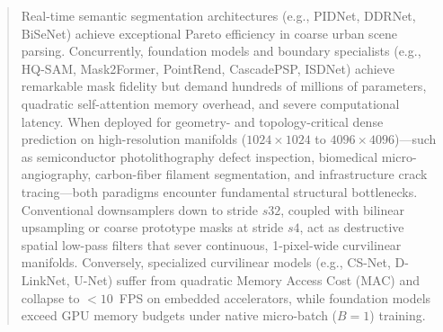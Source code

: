 \documentclass[11pt,a4paper]{article}
\begin{document}
\begin{abstract}
Real-time semantic segmentation architectures (e.g., PIDNet, DDRNet, BiSeNet) achieve exceptional Pareto efficiency in coarse urban scene parsing. Concurrently, foundation models and boundary specialists (e.g., HQ-SAM, Mask2Former, PointRend, CascadePSP, ISDNet) achieve remarkable mask fidelity but demand hundreds of millions of parameters, quadratic self-attention memory overhead, and severe computational latency. When deployed for geometry- and topology-critical dense prediction on high-resolution manifolds ($1024\times 1024$ to $4096\times 4096$)---such as semiconductor photolithography defect inspection, biomedical micro-angiography, carbon-fiber filament segmentation, and infrastructure crack tracing---both paradigms encounter fundamental structural bottlenecks. Conventional downsamplers down to stride $s32$, coupled with bilinear upsampling or coarse prototype masks at stride $s4$, act as destructive spatial low-pass filters that sever continuous, 1-pixel-wide curvilinear manifolds. Conversely, specialized curvilinear models (e.g., CS-Net, D-LinkNet, U-Net) suffer from quadratic Memory Access Cost (MAC) and collapse to $<10$~FPS on embedded accelerators, while foundation models exceed GPU memory budgets under native micro-batch ($B=1$) training.


\end{abstract}
\end{document}
